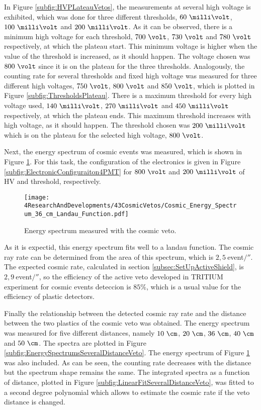 In Figure \ref{subfig:HVPLateauVetos}, the measurements at several high voltage is exhibited, which was done for three different thresholds, $60~\milli\volt$, $100~\milli\volt$ and $200~\milli\volt$. As it can be observed, there is a minimum high voltage for each threshold, $700~\volt$, $730~\volt$ and $780~\volt$ respectively, at which the plateau start. This minimum voltage is higher when the value of the threshold is increased, as it should happen. The voltage chosen was $800~\volt$ since it is on the plateau for the three thresholds. Analogously, the counting rate for several thresholds and fixed high voltage was measured for three different high voltages, $750~\volt$, $800~\volt$ and $850~\volt$, which is plotted in Figure \ref{subfig:ThresholdsPlateau}. There is a maximum threshold for every high voltage used,  $140~\milli\volt$, $270~\milli\volt$ and $450~\milli\volt$ respectively, at which the plateau ends. This maximum threshold increases with high voltage, as it should happen. The threshold chosen was $200~\milli\volt$ which is on the plateau for the selected high voltage, $800~\volt$. 

Next, the energy spectrum of cosmic events was measured, which is shown in Figure \ref{fig:EnergySpectrumCosmicVeto}. For this task, the configuration of the electronics is given in Figure \ref{subfig:ElectronicConfiguraiton4PMT} for $800~\volt$ and $200~\milli\volt$ of HV and threshold, respectively. 

\begin{figure}[h]
\centering
\texttt{[image: 4ResearchAndDevelopments/43CosmicVetos/Cosmic\_Energy\_Spectrum\_36\_cm\_Landau\_Function.pdf]}
\caption{Energy spectrum measured with the cosmic veto.\label{fig:EnergySpectrumCosmicVeto}}
\end{figure}

As it is expectid, this energy spectrum fits well to a landau function. The cosmic ray rate can be determined from the area of this spectrum, which is $2,5~$event$/\second$. The expected cosmic rate, calculated in section \ref{subsec:SetUpActiveShield}, is $2,9~$event$/\second$, so the efficiency of the active veto developed in TRITIUM experiment for cosmic events deteccion is $85\%$, which is a usual value for the efficiency of plastic detectors.

Finally the relationship between the detected cosmic ray rate and the distance between the two plastics of the cosmic veto was obtained. The energy spectrum was measured for five different distances, namely $10~\cm$, $20~\cm$, $36~\cm$, $40~\cm$ and $50~\cm$. The spectra are plotted in Figure \ref{subfig:EnergySpectrumsSeveralDistanceVeto}. The energy spectrum of Figure \ref{fig:EnergySpectrumCosmicVeto} was also included. As can be seen, the counting rate decreases with the distance but the spectrum shape remains the same. The integrated spectra as a function of distance, plotted in Figure \ref{subfig:LinearFitSeveralDistanceVeto}, was fitted to a second degree polynomial which allows to estimate the cosmic rate if the veto distance is changed.


